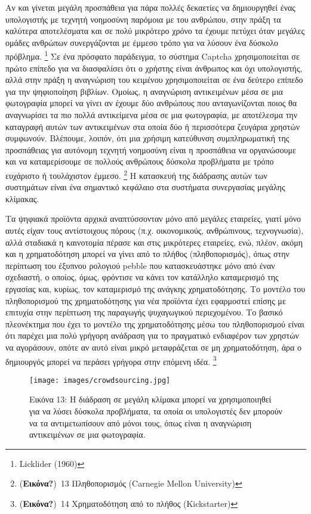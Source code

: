 \documentclass[
]{article}
\begin{document}
Αν και γίνεται μεγάλη προσπάθεια για πάρα πολλές δεκαετίες να
δημιουργηθεί ένας υπολογιστής με τεχνητή νοημοσύνη παρόμοια με του
ανθρώπου, στην πράξη τα καλύτερα αποτελέσματα και σε πολύ μικρότερο
χρόνο τα έχουμε πετύχει όταν μεγάλες ομάδες ανθρώπων συνεργάζονται με
έμμεσο τρόπο για να λύσουν ένα δύσκολο πρόβλημα. \footnote{Licklider
  (1960)} Σε ένα πρόσφατο παράδειγμα, το σύστημα Captcha χρησιμοποιείται
σε πρώτο επίπεδο για να διασφαλίσει ότι ο χρήστης είναι άνθρωπος και όχι
υπολογιστής, αλλά στην πράξη η αναγνώριση του κειμένου χρησιμοποιείται
σε ένα δεύτερο επίπεδο για την ψηφιοποίηση βιβλίων. Ομοίως, η αναγνώριση
αντικειμένων μέσα σε μια φωτογραφία μπορεί να γίνει αν έχουμε δύο
ανθρώπους που ανταγωνίζονται ποιος θα αναγνωρίσει τα πιο πολλά
αντικείμενα μέσα σε μια φωτογραφία, με αποτέλεσμα την καταγραφή αυτών
των αντικειμένων στα οποία δύο ή περισσότερα ζευγάρια χρηστών συμφωνούν.
Βλέπουμε, λοιπόν, ότι μια χρήσιμη κατεύθυνση συμπληρωματική της
προσπάθειας για αυτόνομη τεχνητή νοημοσύνη είναι η προσπάθεια να
οργανώσουμε και να καταμερίσουμε σε πολλούς ανθρώπους δύσκολα προβλήματα
με τρόπο ευχάριστο ή τουλάχιστον έμμεσο. \footnote{(\textbf{Εικόνα?})~13
  Πληθοπορισμός (Carnegie Mellon University)} Η κατασκευή της διάδρασης
αυτών των συστημάτων είναι ένα σημαντικό κεφάλαιο στα συστήματα
συνεργασίας μεγάλης κλίμακας.

Τα ψηφιακά προϊόντα αρχικά αναπτύσσονταν μόνο από μεγάλες εταιρείες,
γιατί μόνο αυτές είχαν τους αντίστοιχους πόρους (π.χ. οικονομικούς,
ανθρώπινους, τεχνογνωσία), αλλά σταδιακά η καινοτομία πέρασε και στις
μικρότερες εταιρείες, ενώ, πλέον, ακόμη και η χρηματοδότηση μπορεί να
γίνει από το πλήθος (πληθοπορισμός), όπως στην περίπτωση του έξυπνου
ρολογιού pebble που κατασκευάστηκε μόνο από έναν σχεδιαστή, ο οποίος,
όμως, φρόντισε να κάνει τον κατάλληλο καταμερισμό της εργασίας και,
κυρίως, τον καταμερισμό της ανάγκης χρηματοδότησης. Το μοντέλο του
πληθοπορισμού της χρηματοδότησης για νέα προϊόντα έχει εφαρμοστεί επίσης
με επιτυχία στην περίπτωση της παραγωγής ψυχαγωγικού περιεχομένου. Το
βασικό πλεονέκτημα που έχει το μοντέλο της χρηματοδότησης μέσω του
πληθοπορισμού είναι ότι παρέχει μια πολύ γρήγορη ανάδραση για το
πραγματικό ενδιαφέρον των χρηστών να αγοράσουν, οπότε αν αυτό είναι
μικρό μεταφράζεται σε μη χρηματοδότηση, άρα ο δημιουργός μπορεί να
περάσει γρήγορα στην επόμενη ιδέα. \footnote{(\textbf{Εικόνα?})~14
  Χρηματοδότηση από το πλήθος (Kickstarter)}

\leavevmode{}%
\begin{figure}
\hypertarget{fig:crowdsourcing}{%
\centering
\texttt{[image: images/crowdsourcing.jpg]}
\caption{Εικόνα 13: Η διάδραση σε μεγάλη κλίμακα μπορεί να
χρησιμοποιηθεί για να λύσει δύσκολα προβλήματα, τα οποία οι υπολογιστές
δεν μπορούν να τα αντιμετωπίσουν από μόνοι τους, όπως είναι η αναγνώριση
αντικειμένων σε μια φωτογραφία.}\label{fig:crowdsourcing}
}
\end{figure}
\end{document}
